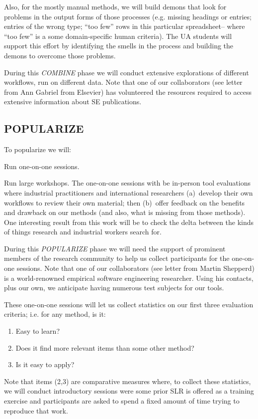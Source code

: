 Also, for the mostly manual methods, we will build  demons that look for problems in the output forms of those processes (e.g. missing headings or entries; entries of the wrong type; ``too few'' rows in this particular spreadsheet-- where ``too few'' is a some domain-specific human criteria).
The UA students will support this effort by identifying the smells in the process and building the demons to overcome those problems.

During this {\em COMBINE} phase we will conduct extensive explorations of different workflows, run on different data.
Note that one of our collaborators (see letter from Ann Gabriel from Elsevier) has volunteered the resources required
to access extensive information about SE publications.

\vspace{8pt}

\subsection{POPULARIZE}\label{tion:pop}
\noindent
To popularize {\IT} we will:
\bii
\item Run one-on-one sessions.
\item Run large workshops.
\eii
The one-on-one sessions with be   in-person tool evaluations  where industrial practitioners and international researchers (a)~develop their own
workflows to review their own material; then (b)~offer feedback on the benefits and drawback on our methods (and also, what is missing from those methods).
One interesting result from this work will be to check the delta between the kinds of things research and industrial workers search for.

During this {\em POPULARIZE} phase we will need the support of prominent members of the research community to help
us collect participants for the one-on-one sessions. Note that one of our  collaborators (see letter from Martin Shepperd) is a world-renowned  empirical software engineering researcher. Using his contacts, plus our own, we anticipate having
numerous test subjects for our tools.


These one-on-one sessions will let us
collect statistics on our first three evaluation criteria; i.e.
for any method, is it:
\begin{enumerate}[itemsep=0pt,parsep=0pt]
\item Easy to learn?
\item Does it find  more relevant
items than some other method? 
\item Is it easy to apply?  
\end{enumerate}
Note that items (2,3) are comparative measures where, to collect
these statistics, we will conduct introductory sessions were some prior SLR
is offered as a training exercise and participants are asked to spend a fixed amount of time trying to reproduce that work.

